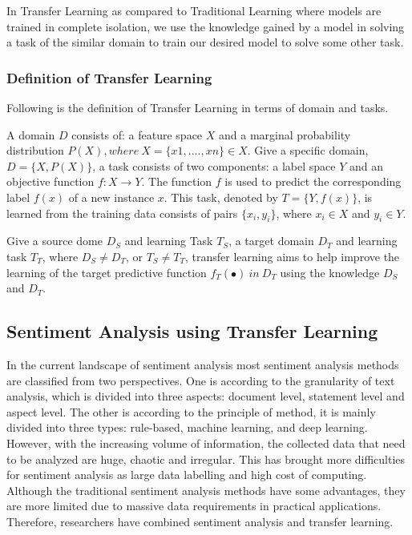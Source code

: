 \documentclass[a4paper, 12pt]{article}
\begin{document}
\begin{sloppypar}
In Transfer Learning as compared to Traditional Learning  where models are trained in complete  isolation, we use the knowledge gained by a model in solving a task of the similar domain to train our desired model to solve some other task.

\subsubsection{Definition of Transfer Learning}

Following is the definition of Transfer Learning in terms of domain and tasks.

A domain $D$ consists of: a feature space $X$ and a marginal probability distribution $P(X), where\ X = \{x1, ...., xn\} \in X$.  Give a specific domain, $D = \{X, P(X)\}$, a task consists of two components: a label space $Y$ and an objective function $f: X \rightarrow Y$. The function $f$ is used to predict the corresponding label $f(x)$ of a new instance $x$. This task, denoted by $T = \{Y, f(x)\}$, is learned from the training data consists of pairs $\{x_i, y_i\}$, where $x_i \in X$ and $y_i \in Y$.\cite{lin_improving_2017}

Give a source dome $D_S$ and learning Task $T_S$, a target domain $D_T$  and learning task $T_T$, where $D_S \ne D_T$, or $T_S \ne T_T$, transfer learning aims to help improve the learning of the target predictive function $f_T( \bullet ) \ in \ D_T$ using the knowledge $D_S$ and $D_T$.\cite{lin_improving_2017}

\subsection{Sentiment Analysis using Transfer Learning}

In the current landscape of sentiment analysis most sentiment analysis methods are classified from two perspectives. One is according to the granularity of text analysis, which is divided into three aspects: document level, statement level and aspect level. The other is according to the principle of method, it is mainly divided into three types: rule-based, machine learning, and deep learning. However, with the increasing volume of information, the collected data that need to be analyzed are huge, chaotic and irregular. This has brought more difficulties for sentiment analysis as large data labelling and high cost of computing. Although the traditional sentiment analysis methods have some advantages, they are more limited due to massive data requirements in practical applications. Therefore, researchers have combined sentiment analysis and transfer learning.\cite{liu_survey_2019}


\end{sloppypar}
\end{document}
